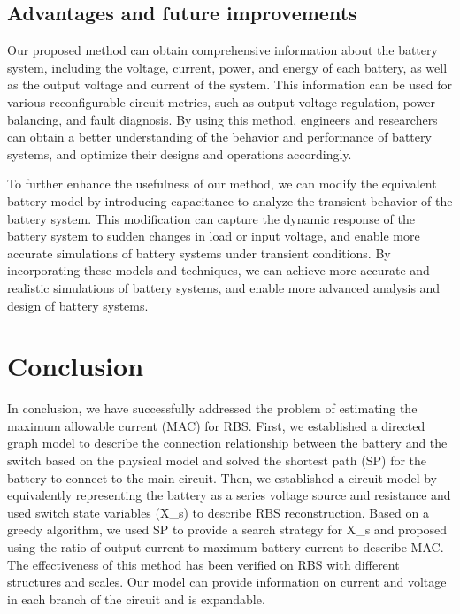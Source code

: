 \documentclass{article}
\begin{document}
\subsection{Advantages and future improvements}



Our proposed method can obtain comprehensive information about the battery system, including the voltage, current, power, and energy of each battery, as well as the output voltage and current of the system.
This information can be used for various reconfigurable circuit metrics, such as output voltage regulation, power balancing, and fault diagnosis. 
By using this method, engineers and researchers can obtain a better understanding of the behavior and performance of battery systems, and optimize their designs and operations accordingly.

To further enhance the usefulness of our method, we can modify the equivalent battery model by introducing capacitance to analyze the transient behavior of the battery system. 
This modification can capture the dynamic response of the battery system to sudden changes in load or input voltage, and enable more accurate simulations of battery systems under transient conditions.
By incorporating these models and techniques, we can achieve more accurate and realistic simulations of battery systems, and enable more advanced analysis and design of battery systems.


\section{Conclusion}

In conclusion, we have successfully addressed the problem of estimating the maximum allowable current (MAC) for RBS. First, we established a directed graph model to describe the connection relationship between the battery and the switch based on the physical model and solved the shortest path (SP) for the battery to connect to the main circuit. Then, we established a circuit model by equivalently representing the battery as a series voltage source and resistance and used switch state variables (X_s) to describe RBS reconstruction. Based on a greedy algorithm, we used SP to provide a search strategy for X_s and proposed using the ratio of output current to maximum battery current to describe MAC. The effectiveness of this method has been verified on RBS with different structures and scales. Our model can provide information on current and voltage in each branch of the circuit and is expandable.





\end{document}
